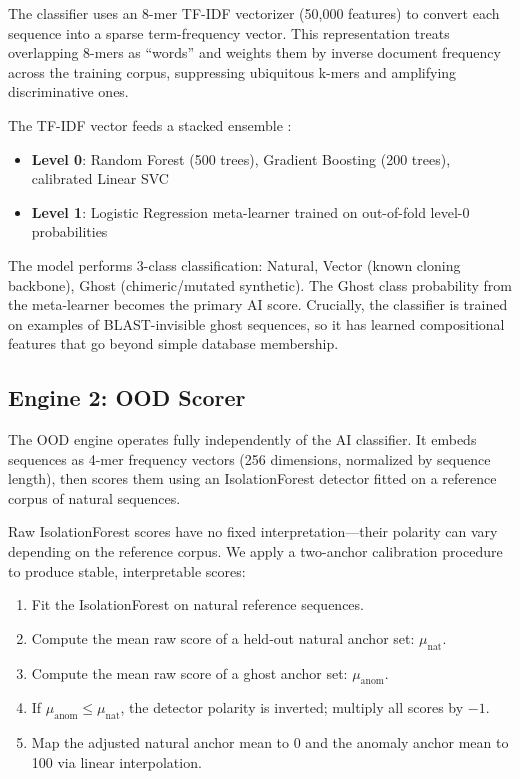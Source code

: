 \documentclass[conference]{IEEEtran}
\begin{document}
The classifier uses an 8-mer TF-IDF vectorizer \cite{salton1988} (50,000 features) to convert each sequence into a sparse term-frequency vector. This representation treats overlapping 8-mers as ``words'' and weights them by inverse document frequency across the training corpus, suppressing ubiquitous k-mers and amplifying discriminative ones.

The TF-IDF vector feeds a stacked ensemble \cite{wolpert1992}:

\begin{itemize}
    \item \textbf{Level 0}: Random Forest \cite{breiman2001} (500 trees), Gradient Boosting \cite{friedman2001} (200 trees), calibrated Linear SVC \cite{sklearn}
    \item \textbf{Level 1}: Logistic Regression meta-learner trained on out-of-fold level-0 probabilities
\end{itemize}

The model performs 3-class classification: Natural, Vector (known cloning backbone), Ghost (chimeric/mutated synthetic). The Ghost class probability from the meta-learner becomes the primary AI score. Crucially, the classifier is trained on examples of BLAST-invisible ghost sequences, so it has learned compositional features that go beyond simple database membership.

\subsection{Engine 2: OOD Scorer}

The OOD engine operates fully independently of the AI classifier. It embeds sequences as 4-mer frequency vectors (256 dimensions, normalized by sequence length), then scores them using an IsolationForest detector \cite{liu2008} fitted on a reference corpus of natural sequences.

Raw IsolationForest scores have no fixed interpretation---their polarity can vary depending on the reference corpus. We apply a two-anchor calibration procedure to produce stable, interpretable scores:

\begin{enumerate}
    \item Fit the IsolationForest on natural reference sequences.
    \item Compute the mean raw score of a held-out natural anchor set: $\mu_{\text{nat}}$.
    \item Compute the mean raw score of a ghost anchor set: $\mu_{\text{anom}}$.
    \item If $\mu_{\text{anom}} \le \mu_{\text{nat}}$, the detector polarity is inverted; multiply all scores by $-1$.
    \item Map the adjusted natural anchor mean to 0 and the anomaly anchor mean to 100 via linear interpolation.
\end{enumerate}
\end{document}
